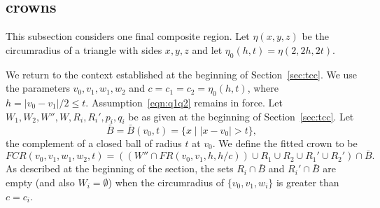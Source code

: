%
%
%
%

\subsection{crowns}

This subsection considers
one final composite region.
Let $\eta(x,y,z)$ be the circumradius of a triangle with
sides $x,y,z$ and let $\eta_0(h,t) = \eta(2,2h,2t)$.

We return to the context established at the beginning
of Section~\ref{sec:tcc}.  We use the parameters $v_0,v_1,w_1,w_2$
and $c=c_1=c_2=\eta_0(h,t)$, where $h =|v_0-v_1|/2 \le t$. 
Assumption~\ref{eqn:q1q2} remains in force.
Let $W_1,W_2,W'',W,R_i,R_i',p_i,q_i$ be as given at the
beginning of Section~\ref{sec:tcc}.
%
Let 
  $$\bar B = \bar B(v_0,t) = \{x \mid |x-v_0| > t\},$$
the complement of a closed ball of radius $t$ at $v_0$.
%
We define the fitted crown to be
$$
FCR(v_0,v_1,w_1,w_2,t) =
  \left((W'' \cap FR(v_0,v_1,h,h/c)) \cup
  R_1 \cup R_2  \cup
  R_1' \cup R_2'\right) \cap \bar B.
$$
As described at the beginning of the section, the 
sets $R_i\cap \bar B$ and $R_i'\cap \bar B$ are empty
(and also $W_i=\emptyset$) when the circumradius of 
$\{v_0,v_1,w_i\}$ is greater than $c=c_i$.

